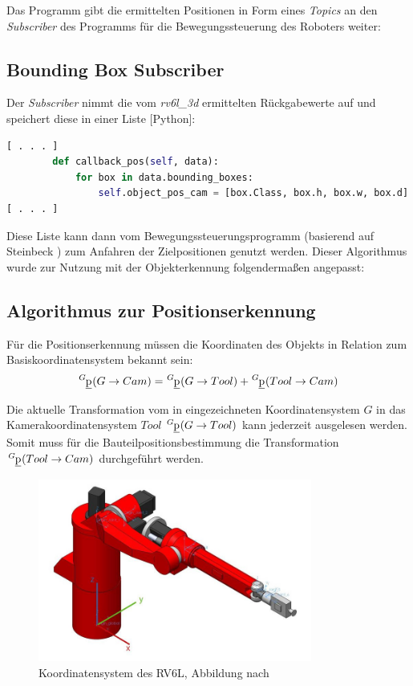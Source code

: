 Das Programm gibt die ermittelten Positionen in Form eines \textit{Topics} an den \textit{Subscriber} des Programms für die Bewegungssteuerung des Roboters weiter:

\subsection{Bounding Box Subscriber}

Der \textit{Subscriber} nimmt die vom \textit{rv6l\_3d} ermittelten Rückgabewerte auf und speichert diese in einer Liste  [Python]:

\begin{lstlisting}[language=python]
[ . . . ]
        def callback_pos(self, data):
            for box in data.bounding_boxes:
                self.object_pos_cam = [box.Class, box.h, box.w, box.d]
[ . . . ]
\end{lstlisting}

Diese Liste kann dann vom Bewegungssteuerungsprogramm (basierend auf Steinbeck \cite[Abschnitt~3.5.2]{steinbeck_entwicklung_2022}) zum Anfahren der Zielpositionen genutzt werden. Dieser Algorithmus wurde zur Nutzung mit der Objekterkennung folgendermaßen angepasst:

\subsection{Algorithmus zur Positionserkennung} \label{subsec:algorithmus_positionserkennung}

Für die Positionserkennung müssen die Koordinaten des Objekts in Relation zum Basiskoordinatensystem bekannt sein:
\begin{equation*}
    \tensor[^{G}]{\mathrm{\underline{p}}}{} (G \to Cam) = \tensor[^{G}]{\mathrm{\underline{p}}}{} (G \to Tool) + \tensor[^{G}]{\mathrm{\underline{p}}}{} (Tool \to Cam) 
\end{equation*}

Die aktuelle Transformation vom in  eingezeichneten Koordinatensystem $G$ in das Kamerakoordinatensystem $Tool$ $\tensor[^{G}]{\mathrm{\underline{p}}}{} (G \to Tool)$ kann jederzeit ausgelesen werden. Somit muss für die Bauteilpositionsbestimmung die Transformation $\tensor[^{G}]{\mathrm{\underline{p}}}{} (Tool \to Cam)$ durchgeführt werden. 

\begin{figure}[ht]
    \centering
    \includegraphics[width=9cm]{Bilder/rv6l_basis.jpg}
    \caption{Koordinatensystem des RV6L, Abbildung nach \cite[Abbildung~12]{leber_steuerung_2021}}
    \label{fig:rv6l_basis}
\end{figure}


